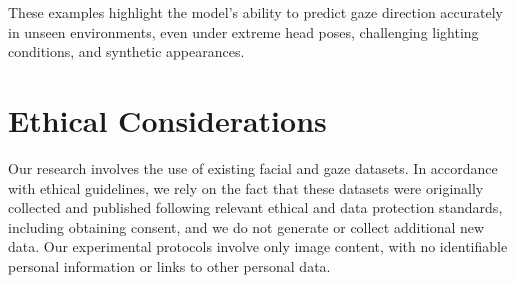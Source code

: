 These examples highlight the model's ability to predict gaze direction accurately in unseen environments, even under extreme head poses, challenging lighting conditions, and synthetic appearances.





\section{Ethical Considerations}

Our research involves the use of existing facial and gaze datasets.
In accordance with ethical guidelines, we rely on the fact that these datasets were originally collected and published following relevant ethical and data protection standards, including obtaining consent, and we do not generate or collect additional new data.
Our experimental protocols involve only image content, with no identifiable personal information or links to other personal data.



